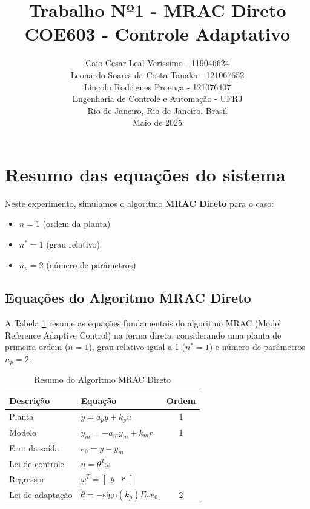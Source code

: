 \documentclass[10pt]{article}
\title{
    Trabalho Nº1 - MRAC Direto \\
    \large COE603 - Controle Adaptativo
}
\author{
    Caio Cesar Leal Verissimo - 119046624 \\
    Leonardo Soares da Costa Tanaka - 121067652 \\
    Lincoln Rodrigues Proença - 121076407 \\
    Engenharia de Controle e Automação - UFRJ \\
    Rio de Janeiro, Rio de Janeiro, Brasil \\
    Maio de 2025
}
\date{}
\begin{document}
\maketitle

\tableofcontents
\newpage

\section{Resumo das equações do sistema}

Neste experimento, simulamos o algoritmo \textbf{MRAC Direto} para o caso:
\begin{itemize}
    \item $n = 1$ \hfill (ordem da planta)
    \item $n^* = 1$ \hfill (grau relativo)
    \item $n_p = 2$ \hfill (número de parâmetros)
\end{itemize}

\subsection{Equações do Algoritmo MRAC Direto}

A Tabela \ref{tab:equacoes_mrac} resume as equações fundamentais do algoritmo MRAC (Model Reference Adaptive Control) na forma direta, considerando uma planta de primeira ordem ($n = 1$), grau relativo igual a 1 ($n^* = 1$) e número de parâmetros $n_p = 2$.

\begin{table}[h!]
\centering
\begin{tabular}{|l|l|c|}
\hline
\textbf{Descrição}      & \textbf{Equação}                                  & \textbf{Ordem} \\ \hline
Planta                  & $\dot{y} = a_p y + k_p u$                         & 1              \\ \hline
Modelo                  & $\dot{y}_m = -a_m y_m + k_m r$                    & 1              \\ \hline
Erro da saída           & $e_0 = y - y_m$                                   &                \\ \hline
Lei de controle         & $u = \theta^T \omega$                  &                \\ \hline
Regressor               & $\omega^T = \begin{bmatrix} y & r \end{bmatrix}$ &                \\ \hline
Lei de adaptação        & $\dot{\theta} = -\text{sign}(k_p)\Gamma \omega e_0$ & 2 \\ \hline
\end{tabular}
\caption{Resumo do Algoritmo MRAC Direto}
\label{tab:equacoes_mrac}
\end{table}
\end{document}
